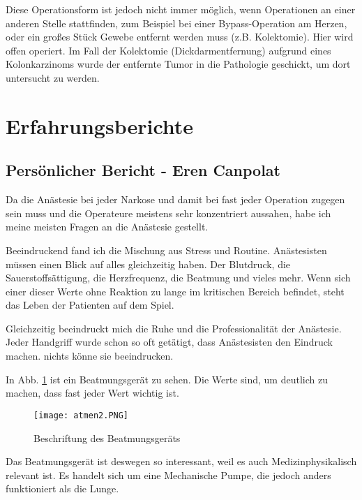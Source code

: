 \documentclass[11pt,a4paper,titlepage]{scrartcl}
\begin{document}
Diese Operationsform ist jedoch nicht immer möglich, wenn Operationen an einer anderen Stelle stattfinden, zum Beispiel bei einer Bypass-Operation am Herzen, oder ein großes Stück Gewebe entfernt werden muss (z.B. Kolektomie).
Hier wird offen operiert.
Im Fall der Kolektomie (Dickdarmentfernung) aufgrund eines Kolonkarzinoms wurde der entfernte Tumor in die Pathologie geschickt, um dort untersucht zu werden. \medskip





\newpage
\section{Erfahrungsberichte}
\subsection{Persönlicher Bericht - Eren Canpolat}

Da die Anästesie bei jeder Narkose und damit bei fast jeder Operation zugegen sein muss und die Operateure meistens sehr konzentriert aussahen, habe ich meine meisten Fragen an die Anästesie gestellt. \medskip

Beeindruckend fand ich die Mischung aus Stress und Routine. Anästesisten müssen einen Blick auf alles gleichzeitig haben. Der Blutdruck, die Sauerstoffsättigung, die Herzfrequenz, die Beatmung und vieles mehr. Wenn sich einer dieser Werte ohne Reaktion zu lange im kritischen Bereich befindet, steht das Leben der Patienten auf dem Spiel. \medskip

Gleichzeitig beeindruckt mich die Ruhe und die Professionalität der Anästesie. Jeder Handgriff wurde schon so oft getätigt, dass Anästesisten den Eindruck machen. nichts könne sie beeindrucken.\medskip

In Abb. \ref{fig:Beatmung} ist ein Beatmungsgerät zu sehen. Die Werte sind, um deutlich zu machen, dass fast jeder Wert wichtig ist. \medskip

 \begin{figure}
        \centering
        \texttt{[image: atmen2.PNG]}
        \caption{Beschriftung des Beatmungsgeräts}
        \label{fig:Beatmung}
        \centering
        \end{figure}
\newpage

Das Beatmungsgerät ist deswegen so interessant, weil es auch Medizinphysikalisch relevant ist. Es handelt sich um eine Mechanische Pumpe, die jedoch anders funktioniert als die Lunge. \medskip
\end{document}
